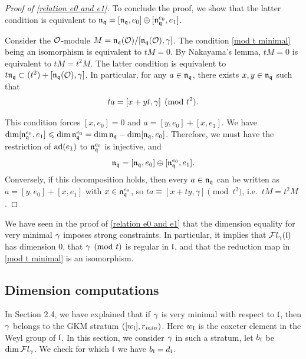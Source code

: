 \documentclass[11pt]{article}
\numberwithin{equation}{section}
\begin{document}
\begin{appendix}
\begin{proof}[Proof of \cref{relation e0 and e1}]
To conclude the proof, we show that the latter condition is equivalent to $\mathfrak{n}_{\mathfrak{q}}
=
[\mathfrak{n}_{\mathfrak{q}},e_0] \oplus [\mathfrak{n}_{\mathfrak{q}}^{e_0},e_1]$.

Consider the $\mathcal{O}$-module $M= \mathfrak{n}_{\mathfrak{q}}(\mathcal{O})/[\mathfrak{n}_{\mathfrak{q}}(\mathcal{O}),\gamma]$. The condition \eqref{mod t minimal} being an isomorphism is equivalent to $tM=0$. By Nakayama's lemma, $tM=0$ is equivalent to $tM=t^2M$. The latter condition is equivalent to $t\mathfrak{n}_{\mathfrak{q}}\subset (t^2)+ [\mathfrak{n}_{\mathfrak{q}}(\mathcal{O}),\gamma]$. In particular, for any $a\in \mathfrak{n}_{\mathfrak{q}}$, there exists $x,y\in \mathfrak{n}_{\mathfrak{q}}$ such that 
$$ta= [x+yt,\gamma]\pmod{t^2}.$$

This condition forces $[x,e_0]=0$ and $a=[y,e_0]+[x,e_1]$. We have $\dim [\mathfrak{n}_{\mathfrak{q}}^{e_0},e_1]\leqslant \dim \mathfrak{n}_{\mathfrak{q}}^{e_0}= \dim \mathfrak{n}_{\mathfrak{q}}- \dim [\mathfrak{n}_{\mathfrak{q}},e_0]$. Therefore, we must have the restriction of $\operatorname{ad} (e_1)$ to $\mathfrak{n}_{\mathfrak{q}}^{e_0}$ is injective, and 
\[
\mathfrak{n}_{\mathfrak{q}}
=
[\mathfrak{n}_{\mathfrak{q}},e_0] \oplus [\mathfrak{n}_{\mathfrak{q}}^{e_0},e_1].
\]
Conversely, if this decomposition holds, then every $a\in\mathfrak{n}_{\mathfrak{q}}$ can be written as $a=[y,e_0]+[x,e_1]$ with $x\in\mathfrak{n}_{\mathfrak{q}}^{e_0}$, so $ta\equiv[x+ty,\gamma]\pmod{t^2}$, i.e.\ $tM=t^2M$.
\end{proof}

We have seen in the proof of \cref{relation e0 and e1} that the dimension equality for very minimal $\gamma$ imposes strong constraints. In particular, it implies that $\mathcal{F}l_\gamma(\mathfrak{l})$ has dimension $0$, that $\gamma \pmod{t}$ is regular in $\mathfrak{l}$, and that the reduction map in \eqref{mod t minimal} is an isomorphism.

\subsection{Dimension computations}
In Section 2.4, we have explained that if $\gamma$ is very minimal with respect to $\mathfrak{l}$, then $\gamma$ belongs to the GKM stratum $([w_{\mathfrak{l}}], r_{min})$. Here $w_{\mathfrak{l}}$ is the coxeter element in the Weyl group of $\mathfrak{l}$. In this section, we consider $\gamma$ in such a stratum, let $b_{\mathfrak{l}}$ be $\dim \mathcal{F}l_\gamma$. We check for which $\mathfrak{l}$ we have $b_{\mathfrak{l}}= d_{\mathfrak{l}}$.


\end{appendix}
\end{document}

